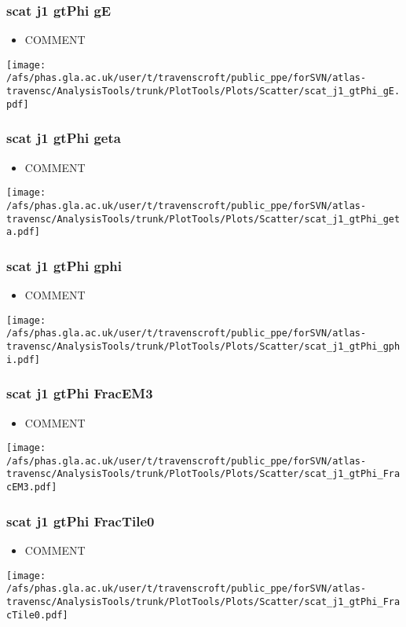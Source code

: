 \documentclass{beamer}
\begin{document}
\begin{frame}
\frametitle{scat j1 gtPhi gE}
\begin{itemize}
\item COMMENT
\end{itemize}
\begin{center}
\texttt{[image: /afs/phas.gla.ac.uk/user/t/travenscroft/public\_ppe/forSVN/atlas-travensc/AnalysisTools/trunk/PlotTools/Plots/Scatter/scat\_j1\_gtPhi\_gE.pdf]}
\end{center}
\end{frame}

\begin{frame}
\frametitle{scat j1 gtPhi geta}
\begin{itemize}
\item COMMENT
\end{itemize}
\begin{center}
\texttt{[image: /afs/phas.gla.ac.uk/user/t/travenscroft/public\_ppe/forSVN/atlas-travensc/AnalysisTools/trunk/PlotTools/Plots/Scatter/scat\_j1\_gtPhi\_geta.pdf]}
\end{center}
\end{frame}

\begin{frame}
\frametitle{scat j1 gtPhi gphi}
\begin{itemize}
\item COMMENT
\end{itemize}
\begin{center}
\texttt{[image: /afs/phas.gla.ac.uk/user/t/travenscroft/public\_ppe/forSVN/atlas-travensc/AnalysisTools/trunk/PlotTools/Plots/Scatter/scat\_j1\_gtPhi\_gphi.pdf]}
\end{center}
\end{frame}

\begin{frame}
\frametitle{scat j1 gtPhi FracEM3}
\begin{itemize}
\item COMMENT
\end{itemize}
\begin{center}
\texttt{[image: /afs/phas.gla.ac.uk/user/t/travenscroft/public\_ppe/forSVN/atlas-travensc/AnalysisTools/trunk/PlotTools/Plots/Scatter/scat\_j1\_gtPhi\_FracEM3.pdf]}
\end{center}
\end{frame}

\begin{frame}
\frametitle{scat j1 gtPhi FracTile0}
\begin{itemize}
\item COMMENT
\end{itemize}
\begin{center}
\texttt{[image: /afs/phas.gla.ac.uk/user/t/travenscroft/public\_ppe/forSVN/atlas-travensc/AnalysisTools/trunk/PlotTools/Plots/Scatter/scat\_j1\_gtPhi\_FracTile0.pdf]}
\end{center}
\end{frame}
\end{document}

